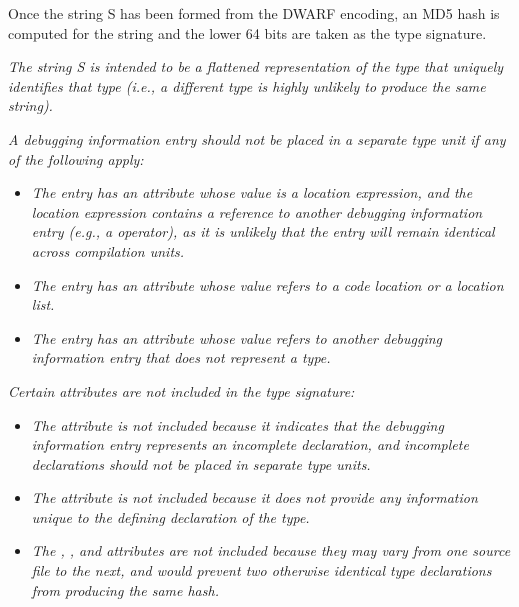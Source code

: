 Once the string S has been formed from the DWARF encoding,
an MD5 hash is computed for the string and the lower 64 bits
are taken as the type signature.

\textit{The string S is intended to be a flattened representation of
the type that uniquely identifies that type (i.e., a different
type is highly unlikely to produce the same string).}

\textit{A debugging information entry should not be placed in a
separate type unit if any of the following apply:}

\begin{itemize}

\item \textit{The entry has an attribute whose value is a location
expression, and the location expression contains a reference to
another debugging information entry (e.g., a 
operator), as it is unlikely that the entry will remain
identical across compilation units.}

\item \textit{The entry has an attribute whose value refers
to a code location or a location list.}

\item \textit{The entry has an attribute whose value refers
to another debugging information entry that does not represent
a type.}
\end{itemize}


\textit{Certain attributes are not included in the type signature:}

\begin{itemize}
\item \textit{The  attribute is not included because it
indicates that the debugging information entry represents an
incomplete declaration, and incomplete declarations should
not be placed in separate type units.}

\item \textit{The  attribute is not included because
it does not provide any information unique to the defining
declaration of the type.}

\item \textit{The , , and
 attributes are not included because they
may vary from one source file to the next, and would prevent
two otherwise identical type declarations from producing the
same hash.}

\end{itemize}
